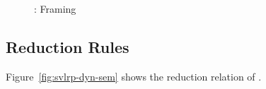 \documentclass {llncs}
\begin{document}

\begin{figure}[!ht]
    \begin{scenter}
        
    \end{scenter}
    \caption{\svlrp: Framing}
    \label{fig:svlrp-iso-frm}
\end{figure}

%
%

\subsection{Reduction Rules}
Figure~\ref{fig:svlrp-dyn-sem} shows the reduction relation of \svlrp.
\end{document}
